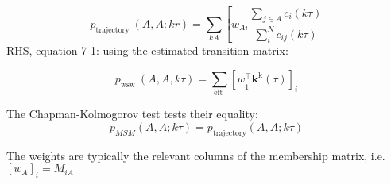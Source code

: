 \begin{equation}
p_{\text {trajectory }}(A, A: k r)=\sum_{k A}\left[w_{A i} \frac{\sum_{j \in A} c_{i}(k \tau)}{\sum_{i}^{N} c_{i j}(k \tau)}\right.
\end{equation}
RHS, equation 7-1: using the estimated transition matrix:

\begin{equation}
p_{\text {wsw }}(A, A, k \tau)=\sum_{\text {eft }}\left[w_{\tilde{1}}^{\top} \mathbf{k}^{\mathrm{k}}(\tau)\right]_{i}
\end{equation}

The Chapman-Kolmogorov test tests their equality:
\begin{equation}\label{eqn:ck_test}
p_{M S M}(A, A ; k \tau)=p_{\text {trajectory}}(A, A ; k \tau)
\end{equation}

The weights are typically the relevant columns of the membership matrix, i.e. $\left[w_{A}\right]_{i}=M_{i A}$
